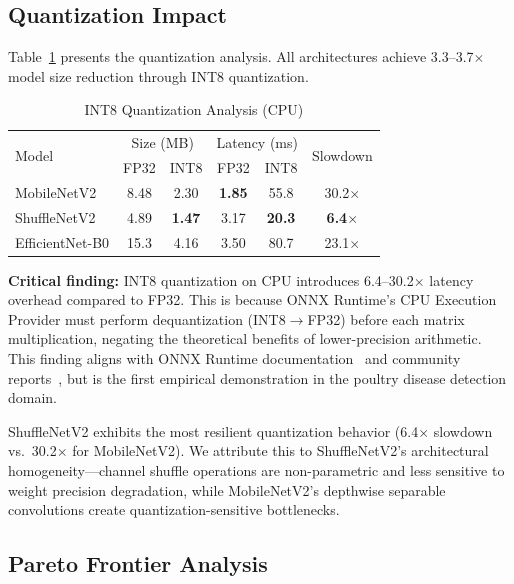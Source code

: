 \documentclass[conference,a4paper]{IEEEtran}
\begin{document}
\subsection{Quantization Impact}

Table~\ref{tab:quantization} presents the quantization analysis. All architectures achieve 3.3--3.7$\times$ model size reduction through INT8 quantization.

\begin{table}[htbp]
\caption{INT8 Quantization Analysis (CPU)}
\label{tab:quantization}
\centering
\begin{tabular}{lccccc}
\toprule
\multirow{2}{*}{Model} & \multicolumn{2}{c}{Size (MB)} & \multicolumn{2}{c}{Latency (ms)} & \multirow{2}{*}{Slowdown} \\
 & FP32 & INT8 & FP32 & INT8 & \\
\midrule
MobileNetV2 & 8.48 & 2.30 & \textbf{1.85} & 55.8 & 30.2$\times$ \\
ShuffleNetV2 & 4.89 & \textbf{1.47} & 3.17 & \textbf{20.3} & \textbf{6.4}$\times$ \\
EfficientNet-B0 & 15.3 & 4.16 & 3.50 & 80.7 & 23.1$\times$ \\
\bottomrule
\end{tabular}
\end{table}

\textbf{Critical finding:} INT8 quantization on CPU introduces 6.4--30.2$\times$ latency overhead compared to FP32. This is because ONNX Runtime's CPU Execution Provider must perform dequantization (INT8$\rightarrow$FP32) before each matrix multiplication, negating the theoretical benefits of lower-precision arithmetic. This finding aligns with ONNX Runtime documentation~\cite{onnxruntime2024} and community reports~\cite{onnxruntime12854}, but is the first empirical demonstration in the poultry disease detection domain.

ShuffleNetV2 exhibits the most resilient quantization behavior (6.4$\times$ slowdown vs.\ 30.2$\times$ for MobileNetV2). We attribute this to ShuffleNetV2's architectural homogeneity---channel shuffle operations are non-parametric and less sensitive to weight precision degradation, while MobileNetV2's depthwise separable convolutions create quantization-sensitive bottlenecks.

\subsection{Pareto Frontier Analysis}
\end{document}
